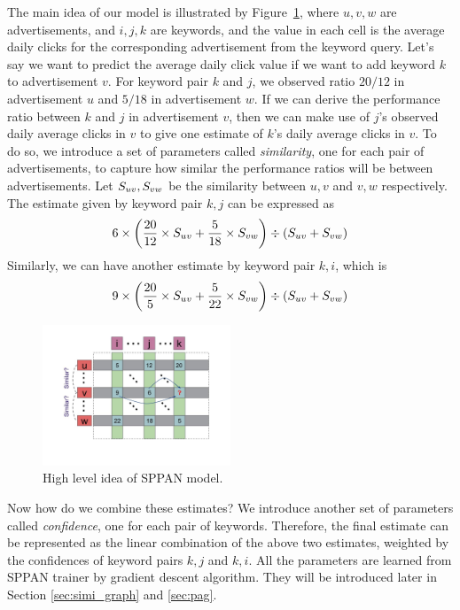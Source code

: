 The main idea of our model is illustrated by
Figure~\ref{fig:sppan-idea}, where $u,v,w$ are advertisements, and
$i,j,k$ are keywords, and the value in each cell is the average daily
clicks for the corresponding advertisement from the keyword query.
Let's say we want to predict the average daily click value if we want
to add keyword $k$ to advertisement $v$. For keyword pair $k$ and $j$,
we observed ratio $20/12$ in advertisement $u$ and $5/18$ in
advertisement $w$. If we can derive the performance ratio between $k$
and $j$ in advertisement $v$, then we can make use of $j$'s observed
daily average clicks in $v$ to give one estimate of $k$'s daily
average clicks in $v$. To do so, we introduce a set of parameters
called {\em similarity}, one for each pair of advertisements, to
capture how similar the performance ratios will be between
advertisements. Let $S_{{u}{v}},S_{{v}{w}}$ be the
similarity between $u,v$ and $v,w$ respectively. The estimate given by
keyword pair $k,j$ can be expressed as
\[ 6\times \left(\frac{20}{12}\times S_{{u}{v}} + \frac{5}{18}\times S_{{v}{w}} \right)\div \left(S_{{u}{v}} + S_{{v}{w}} \right) \]
Similarly, we can have another estimate by keyword pair $k,i$, which is
\[ 9\times \left(\frac{20}{5}\times S_{{u}{v}} + \frac{5}{22}\times S_{{v}{w}} \right)\div \left(S_{{u}{v}} + S_{{v}{w}} \right) \]

\begin{figure}[!ht]
  \centering
  \includegraphics[width=0.5\textwidth]{figures/example.jpg}
  \caption{High level idea of SPPAN model.}
  \label{fig:sppan-idea}
\end{figure}

Now how do we combine these estimates? We introduce another set of
parameters called {\em confidence}, one for each pair of
keywords. Therefore, the final estimate can be represented as the
linear combination of the above two estimates, weighted by the
confidences of keyword pairs $k,j$ and $k,i$. All the parameters are
learned from SPPAN trainer by gradient descent algorithm. They will be
introduced later in Section \ref{sec:simi_graph} and \ref{sec:pag}.

